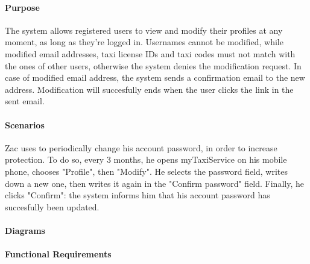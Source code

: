 \paragraph{Purpose}
The system allows registered users to view and modify their profiles at any moment, as long as they're logged in. Usernames cannot be modified, while modified email addresses, taxi license IDs and taxi codes must not match with the ones of other users, otherwise the system denies the modification request. In case of modified email address, the system sends a confirmation email to the new address. Modification will succesfully ends when the user clicks the link in the sent email. 

\paragraph{Scenarios}
Zac uses to periodically change his account password, in order to increase protection. To do so, every 3 months, he opens myTaxiService on his mobile phone, chooses "Profile", then "Modify". He selects the password field, writes down a new one, then writes it again in the "Confirm password" field. Finally, he clicks "Confirm": the system informs him that his account password has succesfully been updated.

\paragraph{Diagrams}

\paragraph{Functional Requirements}
